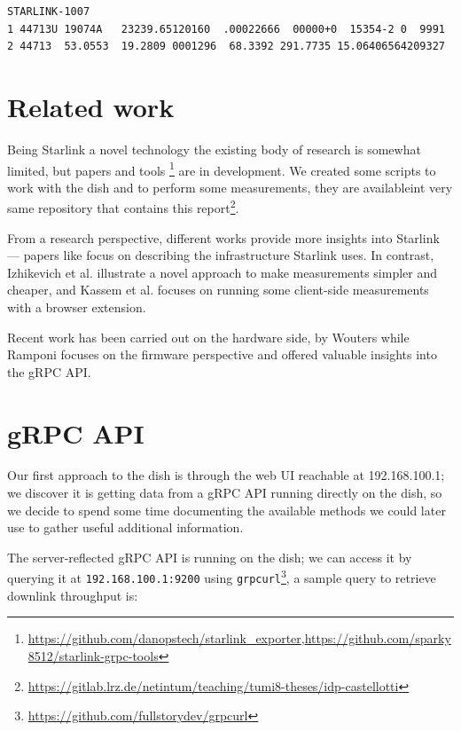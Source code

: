 \documentclass[]{report}
\begin{document}
\begin{lstlisting}[caption={TLE for satellite STARLINK-1007 },captionpos=b]
STARLINK-1007           
1 44713U 19074A   23239.65120160  .00022666  00000+0  15354-2 0  9991
2 44713  53.0553  19.2809 0001296  68.3392 291.7735 15.06406564209327
\end{lstlisting}
    
\section{Related work}
    
Being Starlink a novel technology the existing body of research is somewhat limited, but papers and tools
\footnote{\url{https://github.com/danopstech/starlink\_exporter},\url{https://github.com/sparky8512/starlink-grpc-tools}}
are in development. We created some scripts to work with the dish and to perform some measurements, they are
availableint very same repository that contains this
report\footnote{\url{https://gitlab.lrz.de/netintum/teaching/tumi8-theses/idp-castellotti}}.
    
From a research perspective, different works provide more insights into Starlink — papers like \cite{pan2023measuring}
focus on describing the infrastructure Starlink uses. In contrast, Izhikevich et al. \cite{izhikevich2023democratizing}
illustrate a novel approach to make measurements simpler and cheaper, and Kassem et al.\cite{browser-side} focuses on
running some client-side measurements with a browser extension.
    
Recent work has been carried out on the hardware side, by Wouters \cite{glitching} while Ramponi \cite{quarkslab}
focuses on the firmware perspective and offered valuable insights into the gRPC API.
    
\section{gRPC API}
    
Our first approach to the dish is through the web UI reachable at 192.168.100.1; we discover it is getting data from a
gRPC API running directly on the dish, so we decide to spend some time documenting the available methods we could later
use to gather useful additional information.
    
The server-reflected gRPC API is running on the dish; we can access it by querying it at \texttt{192.168.100.1:9200}
using \texttt{grpcurl}\footnote{\url{https://github.com/fullstorydev/grpcurl}}, a sample query to retrieve downlink
throughput is:
    
\end{document}
